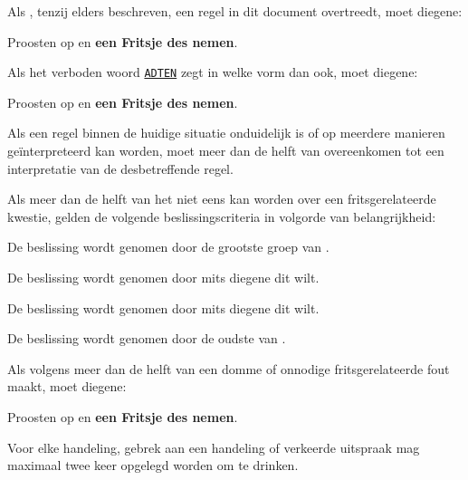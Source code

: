 \vspace{0.5cm}
\label{hoofdstuk:algemeen_start}
\item Als \eenSpelerN, tenzij elders beschreven, een regel in dit document overtreedt, moet diegene:
\puntLijst{}
\item Proosten op  en \textbf{een Fritsje des nemen}\footnotemark[1].
\eindPuntLijst{}
\eindLijst{}

\vervolgLijst{}
\item Als \eenSpeler het verboden woord \ul{\texttt{ADTEN}} zegt in welke vorm dan ook, moet diegene:
\puntLijst{}
\item Proosten op  en \textbf{een Fritsje des nemen}\footnotemark[1].
\eindPuntLijst{}
\eindLijst{}

\vervolgLijst{}
\item Als een regel binnen de huidige situatie onduidelijk is of op meerdere manieren geïnterpreteerd kan worden, moet meer dan de helft van \alleSpelers overeenkomen tot een interpretatie van de desbetreffende regel.
\eindLijst{}

\vervolgLijst{}
\item \label{regel:beslissingCriteria} Als meer dan de helft van \alleSpelers het niet eens kan worden over een fritsgerelateerde kwestie, gelden de volgende beslissingscriteria in volgorde van belangrijkheid:
\numeriekeLijst{}
\item De beslissing wordt genomen door de grootste groep van \alleSpelersN.
\item De beslissing wordt genomen door \Frits mits diegene dit wilt.
\item De beslissing wordt genomen door \Willem mits diegene dit wilt.
\item De beslissing wordt genomen door de oudste van \alleSpelersN.
\eindNumeriekeLijst{}
\eindLijst{}

\vervolgLijst{}
\item Als \eenSpeler volgens meer dan de helft van \alleSpelers een domme of onnodige fritsgerelateerde fout maakt, moet diegene:
\puntLijst{}
\item Proosten op  en \textbf{een Fritsje des nemen}\footnotemark[1].
\eindPuntLijst{}
\eindLijst{}

\vervolgLijst{}
\item Voor elke handeling, gebrek aan een handeling of verkeerde uitspraak mag \eenSpeler maximaal twee keer opgelegd worden om te drinken.
\eindLijst{}

